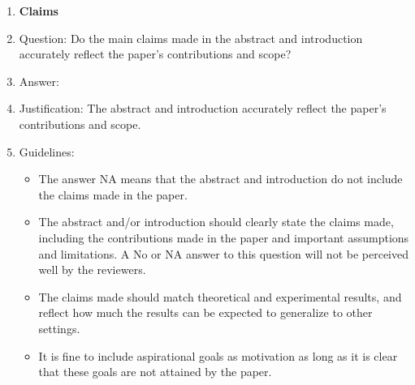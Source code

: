 \documentclass{article}
\theoremstyle{plain}
\theoremstyle{definition}
\theoremstyle{remark}
\begin{document}
\begin{enumerate}

\item {\bf Claims}
    \item[] Question: Do the main claims made in the abstract and introduction accurately reflect the paper's contributions and scope?
    \item[] Answer: \answerYes{} %
    \item[] Justification: The abstract and introduction accurately reflect the paper’s contributions and scope.
    \item[] Guidelines:
    \begin{itemize}
        \item The answer NA means that the abstract and introduction do not include the claims made in the paper.
        \item The abstract and/or introduction should clearly state the claims made, including the contributions made in the paper and important assumptions and limitations. A No or NA answer to this question will not be perceived well by the reviewers. 
        \item The claims made should match theoretical and experimental results, and reflect how much the results can be expected to generalize to other settings. 
        \item It is fine to include aspirational goals as motivation as long as it is clear that these goals are not attained by the paper. 
    \end{itemize}


\end{enumerate}
\end{document}
